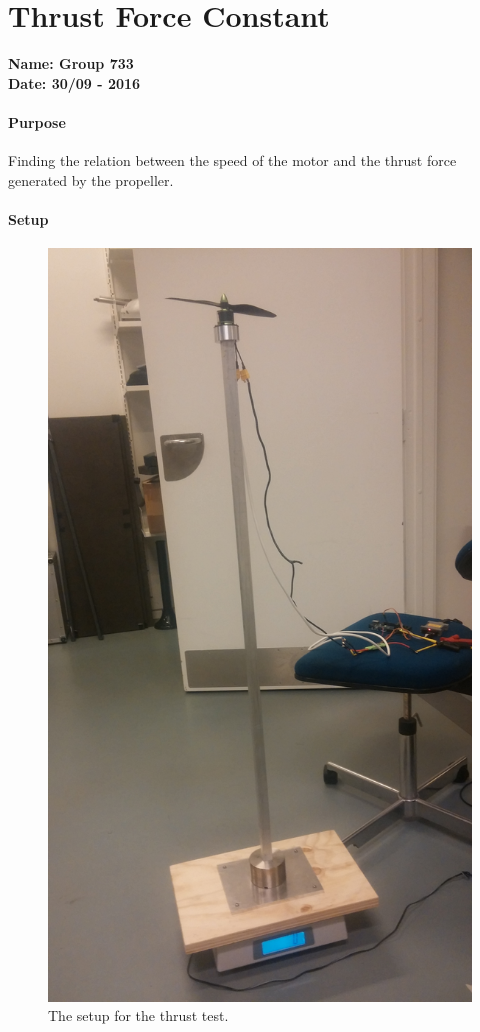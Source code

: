 \chapter{Thrust Force Constant}\label{app:ThrustTest} 
\textbf{Name: Group 733}\\
\textbf{Date: 30/09 - 2016}

\subsubsection{Purpose}
Finding the relation between the speed of the motor and the thrust force generated by the propeller.

\subsubsection{Setup}
\begin{figure}[H]
	\centering
	\includegraphics[scale=0.05,angle =-90]{figures/ThrustTestSetup}
	\caption{The setup for the thrust test.}
	\label{ThrustTest}
\end{figure}


